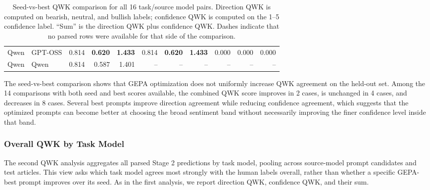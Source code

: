 \documentclass[sigconf,screen]{acmart}
\begin{document}
\begin{table}[t]
\begin{tabular}{llrrrrrrrrr}
        Qwen & GPT-OSS & 0.814 & \textbf{0.620} & \textbf{1.433} & 0.814 & \textbf{0.620} & \textbf{1.433} & 0.000 & 0.000 & 0.000 \\
        Qwen & Qwen & 0.814 & 0.587 & 1.401 & -- & -- & -- & -- & -- & -- \\
        \hline
    \end{tabular}
    \caption{Seed-vs-best QWK comparison for all 16 task/source model pairs.
    Direction QWK is computed on bearish, neutral, and bullish labels;
    confidence QWK is computed on the 1--5 confidence label. ``Sum'' is the
    direction QWK plus confidence QWK. Dashes indicate that no parsed rows were
    available for that side of the comparison.}
    \label{tab:qwk_seed_vs_best}
\end{table}

The seed-vs-best comparison shows that GEPA optimization does not uniformly
increase QWK agreement on the held-out set. Among the 14 comparisons with both
seed and best scores available, the combined QWK score improves in 2 cases, is
unchanged in 4 cases, and decreases in 8 cases. Several best prompts improve
direction agreement while reducing confidence agreement, which suggests that
the optimized prompts can become better at choosing the broad sentiment band
without necessarily improving the finer confidence level inside that band.

\subsubsection{Overall QWK by Task Model}

The second QWK analysis aggregates all parsed Stage 2 predictions by task
model, pooling across source-model prompt candidates and test articles. This
view asks which task model agrees most strongly with the human labels overall,
rather than whether a specific GEPA-best prompt improves over its seed. As in
the first analysis, we report direction QWK, confidence QWK, and their sum.
\end{document}
